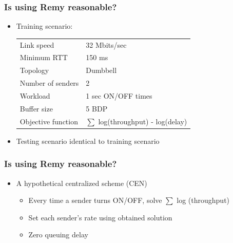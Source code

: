 \begin{frame}
\frametitle{Is using Remy reasonable?}
\begin{itemize}
\item Training scenario:
\begin{tabular}{ll}
Link speed & 32 Mbits/sec \\
Minimum RTT & 150 ms \\
Topology & Dumbbell \\
Number of senders & 2 \\
Workload & 1 sec ON/OFF times \\
Buffer size & 5 BDP \\
Objective function & $\sum$ log(throughput) - log(delay)
\end{tabular}
\item Testing scenario identical to training scenario
\end{itemize}
\end{frame}

\begin{frame}
\frametitle{Is using Remy reasonable?}
\begin{itemize}
\item A hypothetical centralized scheme (CEN)
\begin{itemize}
\item Every time a sender turns ON/OFF, solve $\sum$ log (throughput)
\item Set each sender's rate using obtained solution
\item Zero queuing delay
\end{itemize}
\end{itemize}
\end{frame}

